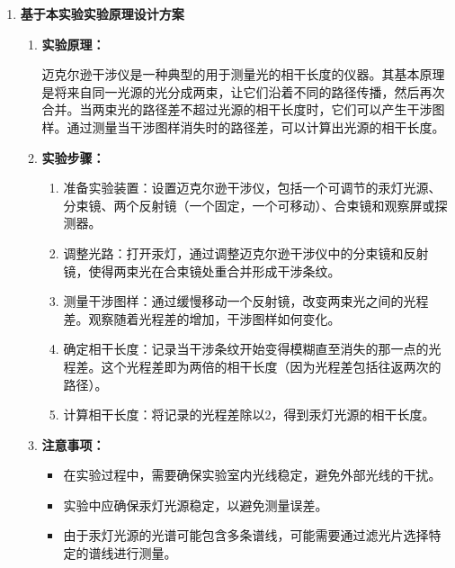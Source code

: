 \documentclass[dvipsnames, svgnames,a4paper,11pt]{article}
\begin{document}
\begin{enumerate}
\begin{enumerate}
		\end{enumerate}
		
		\item \textbf{基于本实验实验原理设计方案}
		
		\begin{enumerate}
			\item \textbf{实验原理：}
			
			迈克尔逊干涉仪是一种典型的用于测量光的相干长度的仪器。其基本原理是将来自同一光源的光分成两束，让它们沿着不同的路径传播，然后再次合并。当两束光的路径差不超过光源的相干长度时，它们可以产生干涉图样。通过测量当干涉图样消失时的路径差，可以计算出光源的相干长度。
			
			\item \textbf{实验步骤：}
			
			\begin{enumerate}
				\item 准备实验装置：设置迈克尔逊干涉仪，包括一个可调节的汞灯光源、分束镜、两个反射镜（一个固定，一个可移动）、合束镜和观察屏或探测器。
				\item 调整光路：打开汞灯，通过调整迈克尔逊干涉仪中的分束镜和反射镜，使得两束光在合束镜处重合并形成干涉条纹。
				\item 测量干涉图样：通过缓慢移动一个反射镜，改变两束光之间的光程差。观察随着光程差的增加，干涉图样如何变化。
				\item 确定相干长度：记录当干涉条纹开始变得模糊直至消失的那一点的光程差。这个光程差即为两倍的相干长度（因为光程差包括往返两次的路径）。
				\item 计算相干长度：将记录的光程差除以2，得到汞灯光源的相干长度。
			\end{enumerate}
			
			\item \textbf{注意事项：}
			
			\begin{itemize}
				\item 在实验过程中，需要确保实验室内光线稳定，避免外部光线的干扰。
				\item 实验中应确保汞灯光源稳定，以避免测量误差。
				\item 由于汞灯光源的光谱可能包含多条谱线，可能需要通过滤光片选择特定的谱线进行测量。
			\end{itemize}
			
		\end{enumerate}
	\end{enumerate}
	
	
	
	
	
\end{document}
